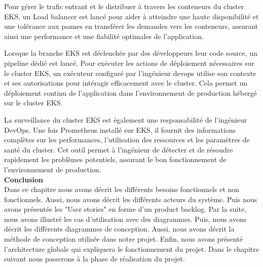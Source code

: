 Pour gérer le trafic entrant et le distribuer à travers les conteneurs du cluster EKS, un Load balancer est lancé pour aider à atteindre une haute disponibilité et une tolérance aux pannes en transférer les demandes vers les conteneurs, assurant ainsi une performance et une fiabilité optimales de l’application.
\\[0.01cm]
\indent
{}  
Lorsque la branche EKS est déclenchée par des développeurs  leur code source, un pipeline dédié est lancé. Pour exécuter les actions de déploiement nécessaires sur le cluster EKS, un exécuteur configuré par l’ingénieur devops utilise son contexte et ses autorisations pour intéragir efficacement avec le cluster. Cela permet un déploiement continu de l’application dans l’environnement de production hébergé sur le cluster EKS.
\\[0.01cm]
\indent
{}  
La surveillance du cluster EKS est également une responsabilité de l’ingénieur DevOps. Une fois Prometheus installé sur EKS, il fournit des informations complètes sur les performances, l’utilisation des ressources et les paramètres de santé du cluster. Cet outil permet à l’ingénieur de détecter et de résoudre rapidement les problèmes potentiels, assurant le bon fonctionnement de l’environnement de production.\\[0.3cm]
          
\textbf{\huge Conclusion}\\[0.5cm] 

Dans ce chapitre nous avons décrit les différents besoins fonctionnels et non fonctionnels. Aussi, nous avons décrit les différents acteurs du système. Puis nous avons présentée les "User stories" en forme d'un product backlog. Par la suite, nous avons illustré les cas d'utilisation avec des diagrammes. Puis, nous avons décrit les différents diagrammes de conception. Aussi, nous avons décrit la méthode de conception utilisée dans notre projet. Enfin, nous avons présenté l'architecture globale qui expliquera le fonctionnement du projet. Dans le chapitre suivant nous passerons à la phase de réalisation du projet.

